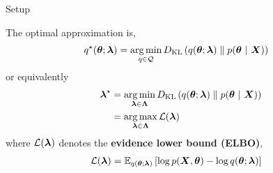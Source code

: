 \documentclass[aspectratio=169]{beamer}
\begin{document}
\begin{frame}[t]{Setup}
    
    
    The optimal approximation is,
    \begin{align*}
        q^\star(\mbtheta; \mblambda) 
        &= \argmin_{q \in \cQ} \KL{q(\mbtheta; \mblambda)}{p(\mbtheta \mid \mbX)}
    \end{align*}
    or equivalently
    \begin{align*}
        \mblambda^\star
        &= \argmin_{\mblambda \in \mbLambda} \KL{q(\mbtheta; \mblambda)}{p(\mbtheta \mid \mbX)} \\
        &= \argmax_{\mblambda \in \mbLambda} \cL(\mblambda)
    \end{align*}
    where $\cL(\mblambda)$ denotes the \textbf{evidence lower bound (ELBO)},
    \begin{align*}
        \cL(\mblambda) &= \E_{q(\mbtheta; \mblambda)} \left[\log p(\mbX, \mbtheta) - \log q(\mbtheta; \mblambda) \right]
    \end{align*}
\end{frame}
    
\end{document}
